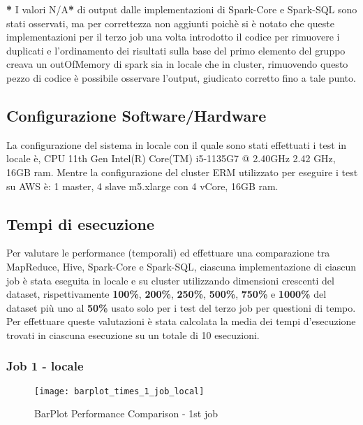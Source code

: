\begin{itemize}
\textbf{*} I valori N/A\textbf{*} di output dalle implementazioni di Spark-Core e Spark-SQL sono stati osservati, ma per correttezza non aggiunti poichè si è notato che queste implementazioni per il terzo job una volta introdotto il codice per rimuovere i duplicati e l'ordinamento dei risultati sulla base del primo elemento del gruppo creava un outOfMemory di spark sia in locale che in cluster, rimuovendo questo pezzo di codice è possibile osservare l'output, giudicato corretto fino a tale punto.
\newpage    

\end{itemize}

\subsection{Configurazione Software/Hardware}
La configurazione del sistema in locale con il quale sono stati effettuati i test in locale è, CPU 11th Gen Intel(R) Core(TM) i5-1135G7 @ 2.40GHz 2.42 GHz, 16GB ram. Mentre la configurazione del cluster ERM utilizzato per eseguire i test su AWS è: 1 master, 4 slave m5.xlarge con 4 vCore, 16GB ram.
\subsection{Tempi di esecuzione}
Per valutare le performance (temporali) ed effettuare una comparazione tra MapReduce, Hive, Spark-Core e Spark-SQL, ciascuna implementazione di ciascun job è stata eseguita in locale e su cluster utilizzando dimensioni crescenti del dataset, rispettivamente \textbf{100\%}, \textbf{200\%}, \textbf{250\%}, \textbf{500\%}, \textbf{750\%} e \textbf{1000\%} del dataset più uno al \textbf{50\%} usato solo per i test del terzo job per questioni di tempo. Per effettuare queste valutazioni è stata calcolata la media dei tempi d'esecuzione trovati in ciascuna esecuzione su un totale di 10 esecuzioni.

\subsubsection{Job 1 - locale}
\begin{figure}[!ht]
    \centering
    \texttt{[image: barplot\_times\_1\_job\_local]}
    \caption{BarPlot Performance Comparison - 1st job}
\end{figure}

